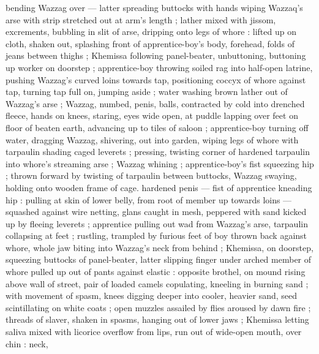 bending Wazzag over --- latter spreading buttocks with hands {\dashcom} wiping Wazzaq's arse with strip stretched out at arm's length ; lather mixed with jissom, excrements, bubbling in slit of arse, dripping onto legs of whore : lifted up on cloth, shaken out, splashing front of apprentice-boy's body, forehead, folds of jeans between thighs ; Khemissa following panel-beater, unbuttoning, buttoning up worker on doorstep ; apprentice-boy throwing soiled rag into half-open latrine, pushing Wazzag's curved loins towards tap, positioning coccyx of whore against tap, turning tap full on, jumping aside ; water washing brown lather out of Wazzag's arse ; Wazzag, numbed, penis, balls, contracted by cold into drenched fleece, hands on knees, staring, eyes wide open, at puddle lapping over feet on floor of beaten earth, advancing up to tiles of saloon ; apprentice-boy turning off water, dragging Wazzag, shivering, out into garden, wiping legs of whore with tarpaulin shading caged leverets ; pressing, twisting corner of hardened tarpaulin into whore's streaming arse ; Wazzag whining ; apprentice-boy's fist squeezing hip ; thrown forward by twisting of tarpaulin between buttocks, Wazzag swaying, holding onto wooden frame of cage. hardened penis --- fist of apprentice kneading hip : pulling at skin of lower belly, from root of member up towards loins --- squashed against wire netting, glans caught in mesh, peppered with sand kicked up by fleeing leverets ; apprentice pulling out wad from Wazzag's arse, tarpaulin collapsing at feet ; rustling, trampled by furious feet of boy thrown back against whore, whole jaw biting into Wazzag's neck from behind ; Khemissa, on doorstep, squeezing buttocks of panel-beater, latter slipping finger under arched member of whore pulled up out of pants against elastic : opposite brothel, on mound rising above wall of street, pair of loaded camels copulating, kneeling in burning sand ; with movement of spasm, knees digging deeper into cooler, heavier sand, seed scintillating on white coats ; open muzzles assailed by flies aroused by dawn fire ; threads of slaver, shaken in spasms, hanging out of lower jaws ; Khemissa letting saliva mixed with licorice overflow from lips, run out of wide-open mouth, over chin : neck,
